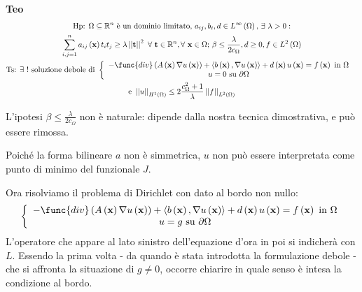 \documentclass{article}
\begin{document}
\textbf{Teo}%
\begin{gather*}
\text{Hp: }\Omega \subseteq 
\mathbb{R}
^{n}\text{ \`{e} un dominio limitato, }a_{ij},b_{i},d\in L^{\infty }\left(
\Omega \right) \text{, }\exists \text{ }\lambda >0: \\
\sum_{i,j=1}^{n}a_{ij}\left( \mathbf{x}\right) t_{i}t_{j}\geq \lambda
\left\vert \left\vert \mathbf{t}\right\vert \right\vert ^{2}\text{ }\forall 
\text{ }\mathbf{t}\in 
\mathbb{R}
^{n},\forall \text{ }\mathbf{x}\in \Omega \text{; }\beta \leq \frac{\lambda 
}{2c_{\Omega }},d\geq 0,f\in L^{2}\left( \Omega \right) \\
\text{Ts: }\exists \text{ }!\text{ soluzione debole di }\left\{ 
\begin{array}{c}
-\func{div}\left( A\left( \mathbf{x}\right) \nabla u\left( \mathbf{x}\right)
\right) +\left\langle b\left( \mathbf{x}\right) ,\nabla u\left( \mathbf{x}%
\right) \right\rangle +d\left( \mathbf{x}\right) u\left( \mathbf{x}\right)
=f\left( \mathbf{x}\right) \text{ in }\Omega \\ 
u=0\text{ su }\partial \Omega%
\end{array}%
\right. \text{ } \\
\text{e }\left\vert \left\vert u\right\vert \right\vert _{H^{1}\left( \Omega
\right) }\leq 2\frac{c_{\Omega }^{2}+1}{\lambda }\left\vert \left\vert
f\right\vert \right\vert _{L^{2}\left( \Omega \right) }
\end{gather*}

L'ipotesi $\beta \leq \frac{\lambda }{2c_{\Omega }}$ non \`{e} naturale:
dipende dalla nostra tecnica dimostrativa, e pu\`{o} essere rimossa.

Poich\'{e} la forma bilineare $a$ non \`{e} simmetrica, $u$ non pu\`{o}
essere interpretata come punto di minimo del funzionale $J$.

Ora risolviamo il problema di Dirichlet con dato al bordo non nullo: 
\begin{equation*}
\left\{ 
\begin{array}{c}
-\func{div}\left( A\left( \mathbf{x}\right) \nabla u\left( \mathbf{x}\right)
\right) +\left\langle b\left( \mathbf{x}\right) ,\nabla u\left( \mathbf{x}%
\right) \right\rangle +d\left( \mathbf{x}\right) u\left( \mathbf{x}\right)
=f\left( \mathbf{x}\right) \text{ in }\Omega \\ 
u=g\text{ su }\partial \Omega%
\end{array}%
\right.
\end{equation*}
L'operatore che appare al lato sinistro dell'equazione d'ora in
poi si indicher\`{a} con $L$. Essendo la prima volta - da quando \`{e} stata
introdotta la formulazione debole - che si affronta la situazione di $g\neq
0 $, occorre chiarire in quale senso \`{e} intesa la condizione al bordo.
\end{document}
